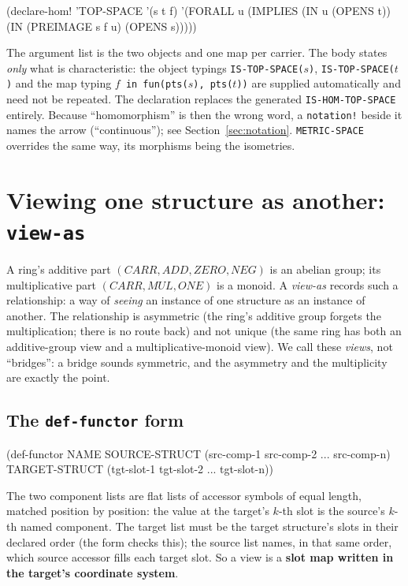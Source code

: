 \begin{VNBcode}
(declare-hom! 'TOP-SPACE '(s t f)
  '(FORALL u (IMPLIES (IN u (OPENS t))
      (IN (PREIMAGE s f u) (OPENS s)))))
\end{VNBcode}

The argument list is the two objects and one map per carrier.  The body states
\emph{only} what is characteristic: the object typings \texttt{IS-TOP-SPACE($s$)},
\texttt{IS-TOP-SPACE($t$)} and the map typing \texttt{$f$ in fun(pts($s$),
pts($t$))} are supplied automatically and need not be repeated.  The declaration
replaces the generated \texttt{IS-HOM-TOP-SPACE} entirely.  Because ``homomorphism''
is then the wrong word, a \texttt{notation!} beside it names the arrow
(``continuous''); see Section~\ref{sec:notation}.  \texttt{METRIC-SPACE} overrides
the same way, its morphisms being the isometries.

\section{Viewing one structure as another: \texttt{view-as}}
\label{sec:view-as}

A ring's additive part $(\mathit{CARR}, \mathit{ADD}, \mathit{ZERO},
\mathit{NEG})$ is an abelian group; its multiplicative part
$(\mathit{CARR}, \mathit{MUL}, \mathit{ONE})$ is a monoid.  A
\emph{view-as} records such a relationship: a way of \emph{seeing} an
instance of one structure as an instance of another.  The relationship
is asymmetric (the ring's additive group forgets the multiplication;
there is no route back) and not unique (the same ring has both an
additive-group view and a multiplicative-monoid view).  We call these
\emph{views}, not ``bridges'': a bridge sounds symmetric, and the
asymmetry and the multiplicity are exactly the point.

\subsection{The \texttt{def-functor} form}

\begin{VNBcode}
(def-functor NAME
  SOURCE-STRUCT  (src-comp-1 src-comp-2 ... src-comp-n)
  TARGET-STRUCT  (tgt-slot-1 tgt-slot-2 ... tgt-slot-n))
\end{VNBcode}

The two component lists are flat lists of accessor symbols of equal
length, matched position by position: the value at the target's $k$-th
slot is the source's $k$-th named component.  The target list must be
the target structure's slots in their declared order (the form checks
this); the source list names, in that same order, which source accessor
fills each target slot.  So a view is a \textbf{slot map written in the
target's coordinate system}.

